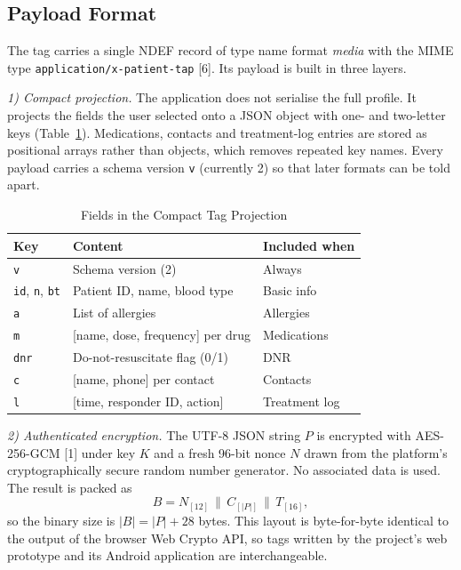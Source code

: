 \subsection{Payload Format}
\label{sec:payload}

The tag carries a single NDEF record of type name format \emph{media} with
the MIME type \texttt{application/x-patient-tap} [6]. Its payload is built in
three layers.

\emph{1) Compact projection.} The application does not serialise the full
profile. It projects the fields the user selected onto a JSON object with
one- and two-letter keys (Table~\ref{tab:fields}). Medications, contacts and
treatment-log entries are stored as positional arrays rather than objects, which
removes repeated key names. Every payload carries a schema version
\texttt{v} (currently 2) so that later formats can be told apart.

\begin{table}[htbp]
\caption{Fields in the Compact Tag Projection}
\label{tab:fields}
\centering
\begin{tabular}{@{}lll@{}}
\toprule
Key & Content & Included when \\
\midrule
\texttt{v}   & Schema version (2)                  & Always \\
\texttt{id}, \texttt{n}, \texttt{bt} & Patient ID, name, blood type & Basic info \\
\texttt{a}   & List of allergies                   & Allergies \\
\texttt{m}   & [name, dose, frequency] per drug    & Medications \\
\texttt{dnr} & Do-not-resuscitate flag (0/1)       & DNR \\
\texttt{c}   & [name, phone] per contact           & Contacts \\
\texttt{l}   & [time, responder ID, action]        & Treatment log \\
\bottomrule
\end{tabular}
\end{table}

\emph{2) Authenticated encryption.} The UTF-8 JSON string $P$ is encrypted
with AES-256-GCM [1] under key $K$ and a fresh 96-bit nonce $N$ drawn from the
platform's cryptographically secure random number generator. No associated
data is used. The result is packed as
\begin{equation}
B = N_{[12]} \,\|\, C_{[|P|]} \,\|\, T_{[16]},
\label{eq:wire}
\end{equation}
so the binary size is $|B| = |P| + 28$ bytes. This layout is byte-for-byte
identical to the output of the browser Web Crypto API, so tags written by the
project's web prototype and its Android application are interchangeable.

